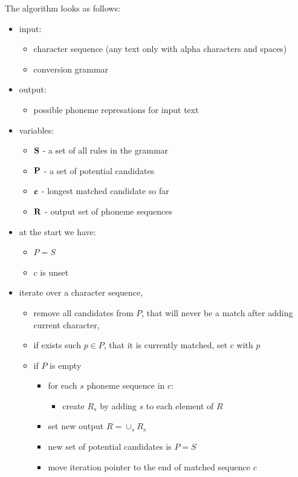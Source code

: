 \documentclass[12pt,a4paper,english]{article}
\begin{document}
The algorithm looks as follows:
\begin{itemize}
    \item input:
        \begin{itemize}
            \item character sequence (any text only with alpha characters and spaces)
            \item conversion grammar
        \end{itemize}
    \item output:
        \begin{itemize}
            \item possible phoneme represations for input text
        \end{itemize}
    \item variables:
        \begin{itemize}
            \item $\bold{S}$ - a set of all rules in the grammar
            \item $\bold{P}$ - a set of potential candidates
            \item $\bold{c}$ - longest matched candidate so far
            \item $\bold{R}$ - output set of phoneme sequences
        \end{itemize}
    \item at the start we have:
        \begin{itemize}
            \item $P = S$
            \item $c$ is unset
        \end{itemize}
    \item iterate over a character sequence,
    \begin{itemize}
        \item remove all candidates from $P$, that will never be a match after adding current character,
        \item if exists such $p \in P$, that it is currently matched, set $c$ with $p$
        \item if $P$ is empty
        \begin{itemize}
            \item for each $s$ phoneme sequence in $c$:
            \begin{itemize}
                \item create $R_s$ by adding $s$ to each element of $R$
            \end{itemize}
            \item set new output $R = \cup_s R_s$ 
            \item new set of potential candidates is $P=S$
            \item move iteration pointer to the end of matched sequence $c$ 
        \end{itemize}
    \end{itemize}

\end{itemize}
\end{document}
